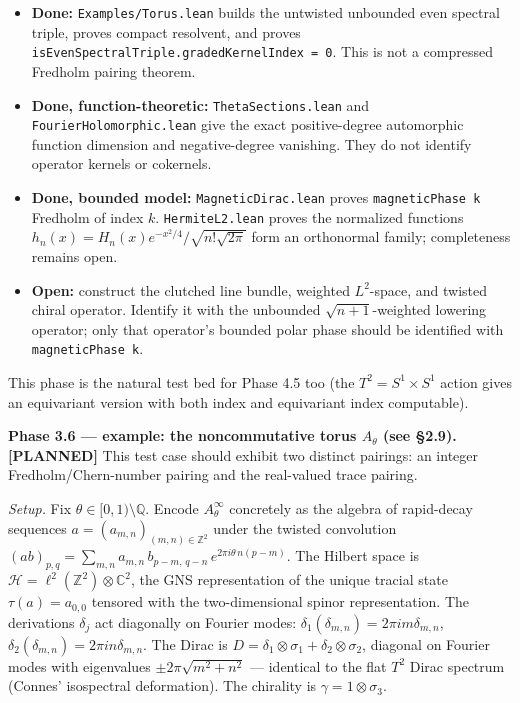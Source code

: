 \documentclass[
  11pt,
]{article}
\providecommand{\tightlist}{%
  \setlength{\itemsep}{0pt}\setlength{\parskip}{0pt}}
\begin{document}
\begin{itemize}
\tightlist
\item
  \textbf{Done:} \texttt{Examples/Torus.lean} builds the untwisted
  unbounded even spectral triple, proves compact resolvent, and proves
  \texttt{isEvenSpectralTriple.gradedKernelIndex = 0}. This is not a
  compressed Fredholm pairing theorem.
\item
  \textbf{Done, function-theoretic:} \texttt{ThetaSections.lean} and
  \texttt{FourierHolomorphic.lean} give the exact positive-degree
  automorphic function dimension and negative-degree vanishing. They do
  not identify operator kernels or cokernels.
\item
  \textbf{Done, bounded model:} \texttt{MagneticDirac.lean} proves
  \texttt{magneticPhase k} Fredholm of index \(k\).
  \texttt{HermiteL2.lean} proves the normalized functions
  \(h_n(x)=H_n(x)e^{-x^2/4}/\sqrt{n!\sqrt{2\pi}}\) form an
  orthonormal family; completeness remains open.
\item
  \textbf{Open:} construct the clutched line bundle, weighted
  \(L^2\)-space, and twisted chiral operator. Identify it with the
  unbounded \(\sqrt{n+1}\)-weighted lowering operator; only that
  operator's bounded polar phase should be identified with
  \texttt{magneticPhase k}.
\end{itemize}

This phase is the natural test bed for Phase 4.5 too (the
\(T^2 = S^1 \times S^1\) action gives an equivariant version with both
index and equivariant index computable).

\textbf{Phase 3.6 --- example: the noncommutative torus \(A_\theta\)
(see §2.9). [PLANNED]} This test case should exhibit two distinct
pairings: an integer Fredholm/Chern-number pairing and the real-valued
trace pairing.

\emph{Setup.} Fix \(\theta \in [0, 1) \setminus \mathbb{Q}\). Encode
\(A_\theta^\infty\) concretely as the algebra of rapid-decay sequences
\(a = (a_{m,n})_{(m,n) \in \mathbb{Z}^2}\) under the twisted convolution
\((ab)_{p,q} = \sum_{m, n} a_{m, n}\,b_{p-m,\,q-n}\,e^{2\pi i \theta\,n(p-m)}\).
The Hilbert space is
\(\mathcal{H}= \ell^2(\mathbb{Z}^2) \otimes \mathbb{C}^2\), the GNS
representation of the unique tracial state \(\tau(a) = a_{0, 0}\)
tensored with the two-dimensional spinor representation. The derivations
\(\delta_j\) act diagonally on Fourier modes:
\(\delta_1(\delta_{m, n}) = 2\pi i m \delta_{m, n}\),
\(\delta_2(\delta_{m, n}) = 2\pi i n \delta_{m, n}\). The Dirac is
\(D = \delta_1 \otimes \sigma_1 + \delta_2 \otimes \sigma_2\), diagonal
on Fourier modes with eigenvalues \(\pm 2\pi\sqrt{m^2 + n^2}\) ---
identical to the flat \(T^2\) Dirac spectrum (Connes' isospectral
deformation). The chirality is \(\gamma = 1 \otimes \sigma_3\).
\end{document}
